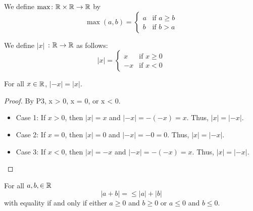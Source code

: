 \documentclass[11pt]{article}
\begin{document}
\begin{definition}
    We define \(\max \colon \mathbb R \times \mathbb R \to \mathbb R\) by \[\max(a, b) = \begin{cases}
            a & \text{if } a \geq b \\
            b & \text{if } b > a
        \end{cases}\]
\end{definition}
\begin{definition}
    We define \(|x|\) \(\colon \mathbb R \rightarrow \mathbb R\) as follows:
    \[
        |x| = \begin{cases}
            x  & \text{if } x \geq 0 \\
            -x & \text{if } x < 0
        \end{cases}
    \]
\end{definition}
\begin{proposition}
    For all \(x \in \mathbb R\), \(|-x| =  |x|\).
\end{proposition}
\begin{proof}
    By P3, x > 0, x = 0, or x < 0. \\
    \begin{itemize}
        \item Case 1: If \(x > 0\), then \(|x| = x\) and \(|-x| = -(-x) = x\). Thus, \(|x| =
              |-x|\).
        \item Case 2: If \(x = 0\), then \(|x| = 0\) and \(|-x| = -0 = 0\). Thus, \(|x| =
              |-x|\).
        \item Case 3: If \(x < 0\), then \(|x| = -x\) and \(|-x| = -(-x) = x\). Thus, \(|x| =
              |-x|\).
    \end{itemize}
\end{proof}

\begin{theorem} 
    For all \(a, b, \in \mathbb R\) \[ |a + b| = \leq |a| + |b| \] with equality if and only if either \( a \geq 0\) and \( b \geq 0\) or \(a \leq
    0\) and \(b \leq 0\).
\end{theorem}
\end{document}
